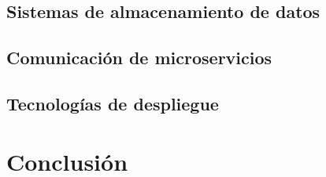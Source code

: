 \subsection{Sistemas de almacenamiento de datos}

\subsection{Comunicación de microservicios}

\subsection{Tecnologías de despliegue}

\section{Conclusión}

